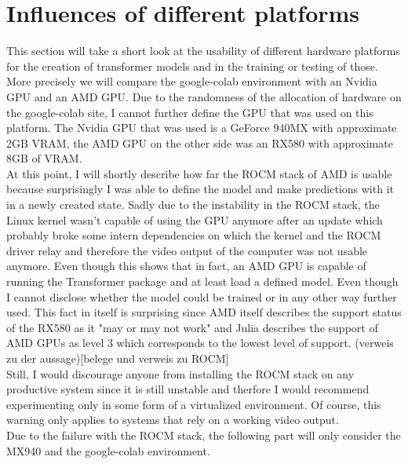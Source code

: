 \section{Influences of different platforms}
This section will take a short look at the usability of different hardware platforms for the creation of transformer models and in the training or testing of those. More precisely we will compare the google-colab environment with an Nvidia GPU and an AMD GPU. Due to the randomness of the allocation of hardware on the google-colab site, I cannot further define the GPU that was used on this platform. The Nvidia GPU that was used is a GeForce 940MX with approximate 2GB VRAM, the AMD GPU on the other side was an RX580 with approximate 8GB of VRAM.\\
At this point, I will shortly describe how far the ROCM stack of AMD is usable because surprisingly I was able to define the model and make predictions with it in a newly created state. Sadly due to the instability in the ROCM stack, the Linux kernel wasn't capable of using the GPU anymore after an update which probably broke some intern dependencies on which the kernel and the ROCM driver relay and therefore the video output of the computer was not usable anymore. Even though this shows that in fact, an AMD GPU is capable of running the Transformer package and at least load a defined model. Even though I cannot disclose whether the model could be trained or in any other way further used. This fact in itself is surprising since AMD itself describes the support status of the RX580 as it "may or may not work" and Julia describes the support of AMD GPUs as level 3 which corresponds to the lowest level of support. (verweis zu der aussage)[belege und verweis zu ROCM]\\
Still, I would discourage anyone from installing the ROCM stack on any productive system since it is still unstable and therfore I would recommend experimenting only in some form of a virtualized environment. Of course, this warning only applies to systems that rely on a working video output.\\
Due to the failure with the ROCM stack, the following part will only consider the MX940 and the google-colab environment.
